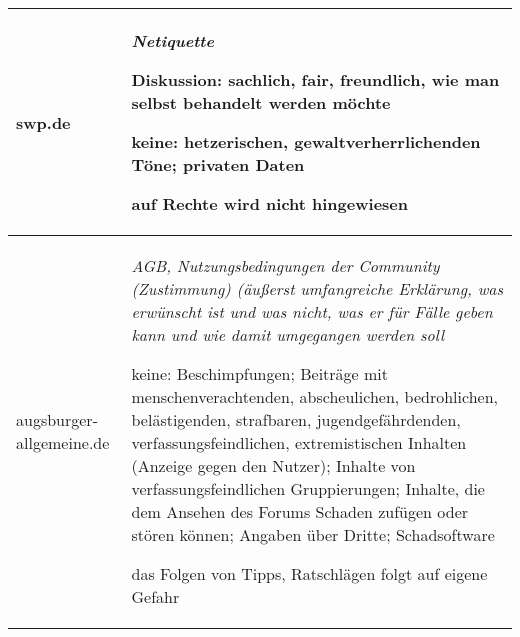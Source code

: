 \begin{landscape}
\begin{longtable}{lp{170mm}}
swp.de & \emph{Netiquette}

	Diskussion: sachlich, fair, freundlich, wie man selbst behandelt werden möchte
	
	keine: het\-ze\-ri\-schen, ge\-walt\-ver\-herr\-li\-chen\-den Töne; privaten Daten
	
	auf Rechte wird nicht hingewiesen\tabularnewline\midrule


augsburger-allgemeine.de & \emph{AGB, Nutzungsbedingungen der Community
  (Zustimmung) (äußerst umfangreiche Erklärung, was erwünscht ist und was nicht,
  was er für Fälle geben kann und wie damit umgegangen werden soll}

  keine: Beschimpfungen; Beiträge mit menschenverachtenden,
  abscheulichen, bedrohlichen, belästigenden, strafbaren, jugendgefährdenden,
  verfassungsfeindlichen, extremistischen Inhalten (Anzeige gegen den Nutzer); 
  Inhalte von verfassungsfeindlichen Gruppierungen; 
  Inhalte, die dem Ansehen des Forums Schaden zufügen oder stören können;  
  Angaben über Dritte; Schadsoftware
  
  das Folgen von Tipps, Ratschlägen folgt auf eigene Gefahr
  
\end{longtable}
\end{landscape}

